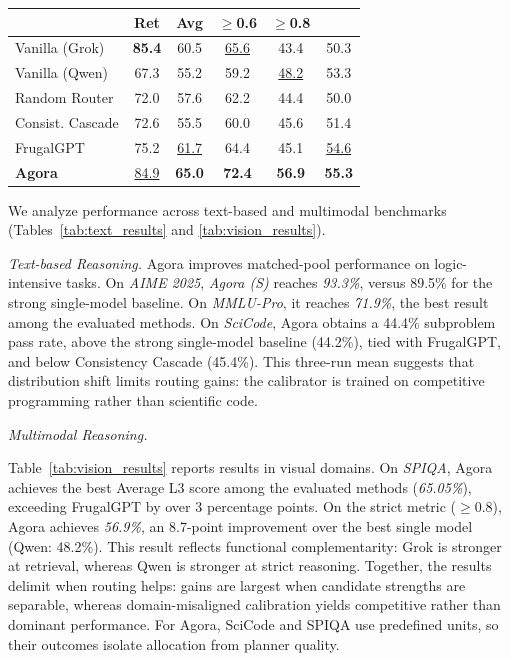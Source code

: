\documentclass[11pt]{article}
\begin{document}
\begin{table}[t]
{\begin{tabular}{lccccc}
         & \textbf{Ret} & \textbf{Avg} & \textbf{$\ge$0.6} & \textbf{$\ge$0.8} & \\
        \midrule
        
        Vanilla (Grok)  & \textbf{{85.4}} & 60.5 & \underline{65.6} & 43.4 & 50.3 \\
        Vanilla (Qwen)    & 67.3 & 55.2 & 59.2 & \underline{48.2} & 53.3 \\
        Random Router     & 72.0 & 57.6 & 62.2 & 44.4 & 50.0 \\
        Consist. Cascade  & 72.6 & 55.5 & 60.0 & 45.6 & 51.4 \\
        FrugalGPT         & 75.2 & \underline{61.7} & 64.4 & 45.1 & \underline{54.6} \\
        \midrule
        \textbf{Agora}  & \underline{84.9} & \textbf{65.0} & \textbf{72.4} & \textbf{56.9} & \textbf{55.3} \\
        \bottomrule
    \end{tabular}%
    }
\end{table}
We analyze performance across text-based and multimodal benchmarks (Tables~\ref{tab:text_results} and \ref{tab:vision_results}).

\emph{Text-based Reasoning.}
Agora improves matched-pool performance on logic-intensive tasks. On \emph{AIME 2025}, \textit{Agora (S)} reaches \emph{93.3\%}, versus 89.5\% for the strong single-model baseline. On \emph{MMLU-Pro}, it reaches \emph{71.9\%}, the best result among the evaluated methods.
On \emph{SciCode}, Agora obtains a 44.4\% subproblem pass rate, above the strong single-model baseline (44.2\%), tied with FrugalGPT, and below Consistency Cascade (45.4\%). This three-run mean suggests that distribution shift limits routing gains: the calibrator is trained on competitive programming rather than scientific code.

\emph{Multimodal Reasoning.}

Table~\ref{tab:vision_results} reports results in visual domains.
On \emph{SPIQA}, Agora achieves the best Average L3 score among the evaluated methods (\emph{65.05\%}), exceeding FrugalGPT by over 3 percentage points.
On the strict metric ($\ge$0.8), Agora achieves \emph{56.9\%}, an 8.7-point improvement over the best single model (Qwen: 48.2\%).
This result reflects functional complementarity: Grok is stronger at retrieval, whereas Qwen is stronger at strict reasoning.
Together, the results delimit when routing helps: gains are largest when candidate strengths are separable, whereas domain-misaligned calibration yields competitive rather than dominant performance.
For Agora, SciCode and SPIQA use predefined units, so their outcomes isolate allocation from planner quality.
\end{document}
